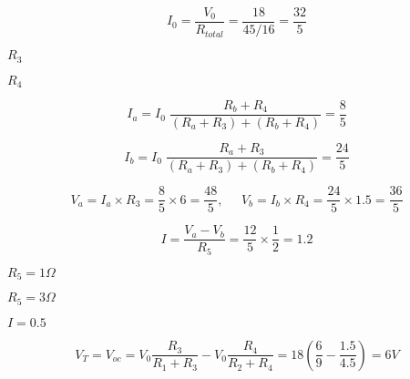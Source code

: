 {\newpage\clearpage
{}%
\begin{displaymath}
I_0=\frac{V_0}{R_{total}}=\frac{18}{45/16}=\frac{32}{5}
\end{displaymath}%
\lthtmldisplayZ
\lthtmlcheckvsize\clearpage}

{\newpage\clearpage
{}%
$R_3$%
\lthtmlinlinemathZ
\lthtmlcheckvsize\clearpage}

{\newpage\clearpage
{}%
$R_4$%
\lthtmlinlinemathZ
\lthtmlcheckvsize\clearpage}

{\newpage\clearpage
{}%
\begin{displaymath} 
I_a=I_0\;\frac{R_b+R_4}{(R_a+R_3)+(R_b+R_4)}=\frac{8}{5} 
\end{displaymath}%
\lthtmldisplayZ
\lthtmlcheckvsize\clearpage}

{\newpage\clearpage
{}%
\begin{displaymath} 
I_b=I_0\;\frac{R_a+R_3}{(R_a+R_3)+(R_b+R_4)}=\frac{24}{5}
\end{displaymath}%
\lthtmldisplayZ
\lthtmlcheckvsize\clearpage}

{\newpage\clearpage
{}%
\begin{displaymath}
V_a=I_a \times R_3=\frac{8 }{5} \times 6=\frac{48}{5},\;\;\;\;\;
V_b=I_b \times R_4=\frac{24}{5} \times 1.5=\frac{36}{5}	
\end{displaymath}%
\lthtmldisplayZ
\lthtmlcheckvsize\clearpage}

{\newpage\clearpage
{}%
\begin{displaymath}
I=\frac{V_a-V_b}{R_5}=\frac{12}{5}\times \frac{1}{2}=1.2
\end{displaymath}%
\lthtmldisplayZ
\lthtmlcheckvsize\clearpage}

{\newpage\clearpage
{}%
$R_5=1\Omega$%
\lthtmlinlinemathZ
\lthtmlcheckvsize\clearpage}

{\newpage\clearpage
{}%
$R_5=3\Omega$%
\lthtmlinlinemathZ
\lthtmlcheckvsize\clearpage}

{\newpage\clearpage
{}%
$I=0.5$%
\lthtmlinlinemathZ
\lthtmlcheckvsize\clearpage}

{\newpage\clearpage
{}%
\begin{displaymath}	
V_T=V_{oc}=V_0\frac{R_3}{R_1+R_3}-V_0\frac{R_4}{R_2+R_4}
=18 \left(\frac{6}{9}-\frac{1.5}{4.5}\right)=6V 
\end{displaymath}%
\lthtmldisplayZ
\lthtmlcheckvsize\clearpage}

